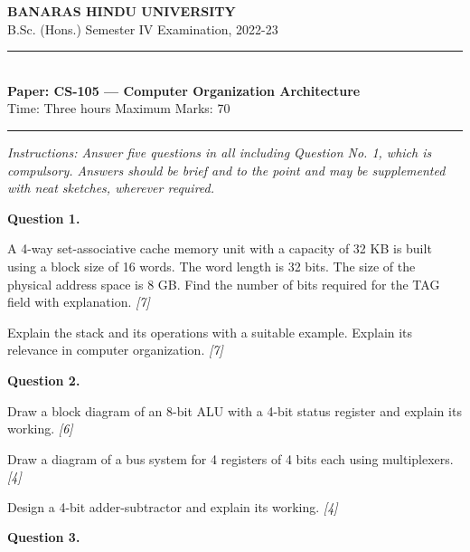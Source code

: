 \documentclass[11pt,a4paper]{article}
\newcommand{\pts}[1]{\hfill   \textit{[#1]}}
\begin{document}
\begin{center}
  {\large\bfseries BANARAS HINDU UNIVERSITY}\\[2pt]
  {
\normalsize B.Sc. (Hons.) Semester IV Examination, 2022-23}\\[6pt]
  \rule{0.8\linewidth}{0.5pt}\\[6pt]
  {\large\bfseries Paper: CS-105 --- Computer Organization Architecture}\\[4pt]
  {
\normalsize Time: Three hours \hfill Maximum Marks: 70}
\end{center}

\rule{\linewidth}{0.4pt}

\smallskip



\noindent   \textit{Instructions: Answer five questions in all including Question No. 1, which is compulsory. Answers should be brief and to the point and may be supplemented with neat sketches, wherever required.}

\bigskip

\medskip


\noindent   \textbf{Question 1.}

\begin{parts}
  \item A 4-way set-associative cache memory unit with a capacity of 32 KB is built using a block size of 16 words. The word length is 32 bits. The size of the physical address space is 8 GB. Find the number of bits required for the TAG field with explanation. \pts{7}
  \item Explain the stack and its operations with a suitable example. Explain its relevance in computer organization. \pts{7}
\end{parts}

\medskip


\noindent   \textbf{Question 2.}

\begin{parts}
  \item Draw a block diagram of an 8-bit ALU with a 4-bit status register and explain its working. \pts{6}
  \item Draw a diagram of a bus system for 4 registers of 4 bits each using multiplexers. \pts{4}
  \item Design a 4-bit adder-subtractor and explain its working. \pts{4}
\end{parts}

\medskip


\noindent   \textbf{Question 3.}
\end{document}
